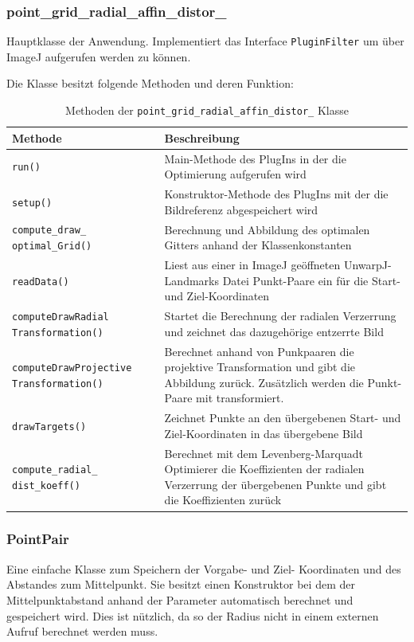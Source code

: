 \subsubsection{point\_grid\_radial\_affin\_distor\_}
Hauptklasse der Anwendung. Implementiert das Interface \texttt{PluginFilter} um über ImageJ aufgerufen werden zu können.

Die Klasse besitzt folgende Methoden und deren Funktion:

\begin{table}[H]
	\begin{tabular}{|p{} | p{}|} 
		\hline
		\textbf{Methode}& \textbf{Beschreibung}\\
		\hline
		\texttt{run()} & Main-Methode des PlugIns in der die Optimierung aufgerufen wird\\ \hline
		\texttt{setup()} & Konstruktor-Methode des PlugIns mit der die Bildreferenz abgespeichert wird\\ \hline
		\texttt{compute\_draw\_ optimal\_Grid()} & Berechnung und Abbildung des optimalen Gitters anhand der Klassenkonstanten \\ \hline
		\texttt{readData()} & Liest aus einer in ImageJ geöffneten UnwarpJ-Landmarks Datei Punkt-Paare ein für die Start- und Ziel-Koordinaten\\\hline
		\texttt{computeDrawRadial Transformation()} & Startet die Berechnung der radialen Verzerrung und zeichnet das dazugehörige entzerrte Bild\\ \hline
		\texttt{computeDrawProjective Transformation()} & Berechnet anhand von Punkpaaren die projektive Transformation und gibt die Abbildung zurück. Zusätzlich werden die Punkt-Paare mit transformiert.\\ \hline
		\texttt{drawTargets()} & Zeichnet Punkte an den übergebenen Start- und Ziel-Koordinaten in das übergebene Bild\\ \hline
		\texttt{compute\_radial\_ dist\_koeff()} & Berechnet mit dem Levenberg-Marquadt Optimierer die Koeffizienten der radialen Verzerrung der übergebenen Punkte und gibt die Koeffizienten zurück\\ 
		\hline
	\end{tabular}
	\caption{Methoden der \texttt{point\_grid\_radial\_affin\_distor\_} Klasse}
\end{table}

\subsubsection{PointPair}
Eine einfache Klasse zum Speichern der Vorgabe- und Ziel- Koordinaten und des Abstandes zum Mittelpunkt. Sie besitzt einen Konstruktor bei dem der Mittelpunktabstand anhand der Parameter automatisch berechnet und gespeichert wird. Dies ist nützlich, da so der Radius nicht in einem externen Aufruf berechnet werden muss.

